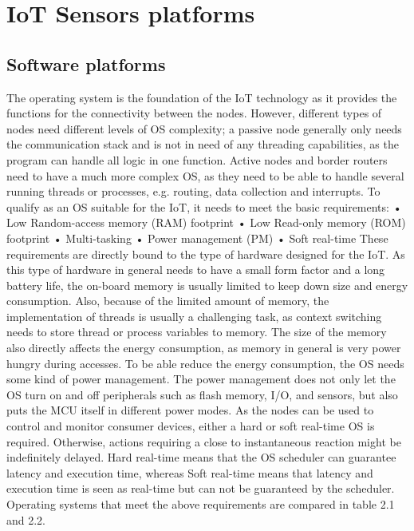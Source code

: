 \section{IoT Sensors platforms}


\subsection{Software platforms}


The operating system is the foundation of the IoT technology as it provides the functions for the connectivity between the nodes.
However,
	different types of nodes need different levels of OS complexity;
	a passive node generally only needs the communication stack and is not in need of any threading capabilities,
	as the program can handle all logic in one function.
Active nodes and border routers need to have a much more complex OS,
	as they need to be able to handle several running threads or processes,
	e.g.
routing,
	data collection and interrupts.
To qualify as an OS suitable for the IoT,
	it needs to meet the basic requirements:
	• Low Random-access memory (RAM) footprint 
	• Low Read-only memory (ROM) footprint 
	• Multi-tasking • Power management (PM) 
	• Soft real-time These requirements are directly bound to the type of hardware designed for the IoT.
As this type of hardware in general needs to have a small form factor and a long battery life,
	the on-board memory is usually limited to keep down size and energy consumption.
Also,
	because of the limited amount of memory,
	the implementation of threads is usually a challenging task,
	as context switching needs to store thread or process variables to memory.
The size of the memory also directly affects the energy consumption,
	as memory in general is very power hungry during accesses.
To be able reduce the energy consumption,
	the OS needs some kind of power management.
The power management does not only let the OS turn on and off peripherals such as flash memory,
	I/O,
	and sensors,
	but also puts the MCU itself in different power modes.
As the nodes can be used to control and monitor consumer devices,
	either a hard or soft real-time OS is required.
Otherwise,
	actions requiring a close to instantaneous reaction might be indefinitely delayed.
Hard real-time means that the OS scheduler can guarantee latency and execution time,
	whereas Soft real-time means that latency and execution time is seen as real-time but can not be guaranteed by the scheduler.
Operating systems that meet the above requirements are compared in table 2.1 and 2.2.

